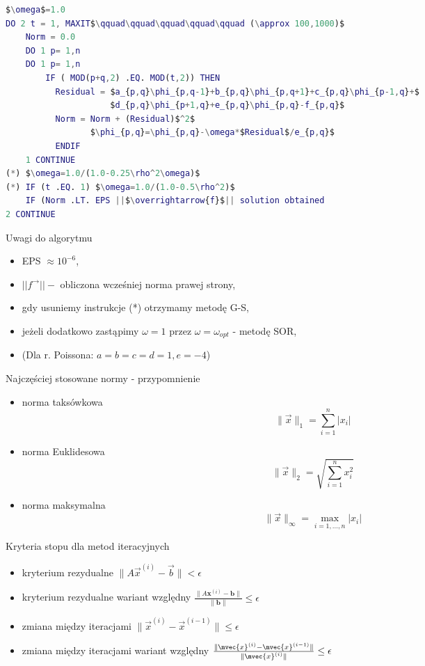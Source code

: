 \begin{frame}[fragile]{}
\begin{lstlisting}[language=Matlab, mathescape]
$\omega$=1.0
DO 2 t = 1, MAXIT$\qquad\qquad\qquad\qquad\qquad (\approx 100,1000)$
    Norm = 0.0
    DO 1 p= 1,n
    DO 1 p= 1,n
        IF ( MOD(p+q,2) .EQ. MOD(t,2)) THEN
          Residual = $a_{p,q}\phi_{p,q-1}+b_{p,q}\phi_{p,q+1}+c_{p,q}\phi_{p-1,q}+$
                     $d_{p,q}\phi_{p+1,q}+e_{p,q}\phi_{p,q}-f_{p,q}$
          Norm = Norm + (Residual)$^2$
                 $\phi_{p,q}=\phi_{p,q}-\omega*$Residual$/e_{p,q}$
          ENDIF
    1 CONTINUE
(*) $\omega=1.0/(1.0-0.25\rho^2\omega)$
(*) IF (t .EQ. 1) $\omega=1.0/(1.0-0.5\rho^2)$
    IF (Norm .LT. EPS ||$\overrightarrow{f}$|| solution obtained
2 CONTINUE
\end{lstlisting}
\end{frame}
\begin{frame}{}
  \begin{block}{Uwagi do algorytmu}
    \begin{itemize}
      \item EPS $\approx 10^{-6}$,
      \item $||f^\rightarrow|| -$ obliczona wcześniej norma prawej strony,
      \item gdy usuniemy instrukcje (*) otrzymamy metodę G-S,
      \item jeżeli dodatkowo zastąpimy $\omega=1$ przez $\omega=\omega_{opt}$ - metodę SOR,
      \item (Dla r. Poissona: $a=b=c=d=1, e=-4$)
    \end{itemize}
  \end{block}
\end{frame}
\begin{frame}{Najczęściej stosowane normy - przypomnienie}
\begin{itemize}
    \item  norma taksówkowa $$\|\vec{x}\|_1 = \sum_{i=1}^n |x_i|$$
\item norma Euklidesowa $$\|\vec{x}\|_2 = \sqrt{\sum_{i=1}^n x_i^2} $$
\item norma maksymalna 
$$\|\vec{x}\|_\infty = \max_{i=1,\dots,n} |x_i|$$
\end{itemize}
\end{frame}
\begin{frame}{Kryteria stopu dla metod iteracyjnych}
\begin{itemize}
    \item kryterium rezydualne $\|A \vec{x}^{(i)} - \vec{b}\| < \epsilon$ 
    \item kryterium rezydualne wariant względny $\frac{\|A\mathbf{x}^{(i)} - \mathbf{b}\|}{\|\mathbf{b}\|} \leq \epsilon$  
    \item zmiana między iteracjami $\|\vec{x}^{(i)} - \vec{x}^{(i-1)}\|\leq \epsilon$  
    \item zmiana między iteracjami wariant względny 
    $\frac{\|\mvec{x}^{(i)} - \mvec{x}^{(i-1)}\|}{\|\mvec{x}^{(i)}\|} \leq \epsilon$  
\end{itemize}
\end{frame}



